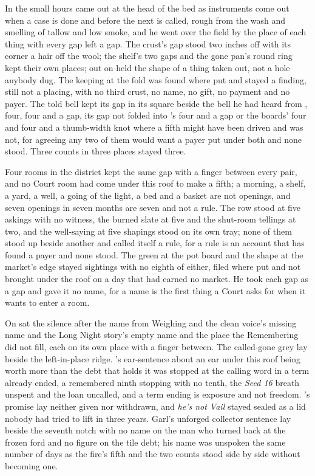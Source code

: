In the small hours  came out at the head of the bed as instruments come out when a case is done and before the next is called, rough from the wash and smelling of tallow and low smoke, and he went over the field by the place of each thing with every gap left a gap. The crust's gap stood two inches off with its corner a hair off the wool; the shelf's two gaps and the gone pan's round ring kept their own places;  out on  held the shape of a thing taken out, not a hole anybody dug. The keeping at the fold was found where put and stayed a finding, still not a placing, with no third crust, no name, no gift, no payment and no payer. The told bell kept its gap in its square beside the bell he had heard from , four, four and a gap, its gap not folded into 's four and a gap or the boards' four and four and a thumb-width knot where a fifth might have been driven and was not, for agreeing any two of them would want a payer put under both and none stood. Three counts in three places stayed three.

Four rooms in the district kept the same gap with a finger between every pair, and no Court room had come under this roof to make a fifth; a morning, a shelf, a yard, a well, a going of the light, a bed and a basket are not openings, and seven openings in seven months are seven and not a rule. The row stood at five askings with no witness, the burned slate at five and the shut-room tellings at two, and the well-saying at five shapings stood on its own tray; none of them stood up beside another and called itself a rule, for a rule is an account that has found a payer and none stood. The green at the pot board and the shape at the market's edge stayed sightings with no eighth of either, filed where put and not brought under the roof on a day that had earned no market. He took each gap as a gap and gave it no name, for a name is the first thing a Court asks for when it wants to enter a room.

On  sat the silence after the name from Weighing and the clean voice's missing name and the Long Night story's empty name and the place the Remembering did not fill, each on its own place with a finger between. The called-gone grey lay beside the left-in-place ridge. 's ear-sentence about an ear under this roof being worth more than the debt that holds it was stopped at the calling word in a term already ended, a remembered ninth stopping with no tenth, the \emph{Seed 16} breath unspent and the loan uncalled, and a term ending is exposure and not freedom. 's promise lay neither given nor withdrawn, and \emph{he's not Vail} stayed sealed as a lid nobody had tried to lift in three years. Garl's unforged collector sentence lay beside the seventh notch with no name on the man who turned back at the frozen ford and no figure on the tile debt; his name was unspoken the same number of days as the fire's fifth and the two counts stood side by side without becoming one.

